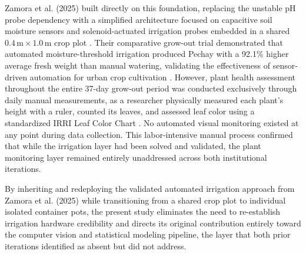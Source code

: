 Zamora et al. (2025) built directly on this foundation, replacing the unstable pH probe dependency with a simplified architecture focused on capacitive soil moisture sensors and solenoid-actuated irrigation probes embedded in a shared \(0.4\,\mathrm{m} \times 1.0\,\mathrm{m}\) crop plot \cite{ZamoraOgue2025}. Their comparative grow-out trial demonstrated that automated moisture-threshold irrigation produced Pechay with a 92.1\% higher average fresh weight than manual watering, validating the effectiveness of sensor-driven automation for urban crop cultivation \cite{ZamoraOgue2025}. However, plant health assessment throughout the entire 37-day grow-out period was conducted exclusively through daily manual measurements, as a researcher physically measured each plant's height with a ruler, counted its leaves, and assessed leaf color using a standardized IRRI Leaf Color Chart \cite{ZamoraOgue2025}. No automated visual monitoring existed at any point during data collection. This labor-intensive manual process confirmed that while the irrigation layer had been solved and validated, the plant monitoring layer remained entirely unaddressed across both institutional iterations.

By inheriting and redeploying the validated automated irrigation approach from Zamora et al. (2025) while transitioning from a shared crop plot to individual isolated container pots, the present study eliminates the need to re-establish irrigation hardware credibility and directs its original contribution entirely toward the computer vision and statistical modeling pipeline, the layer that both prior iterations identified as absent but did not address.
